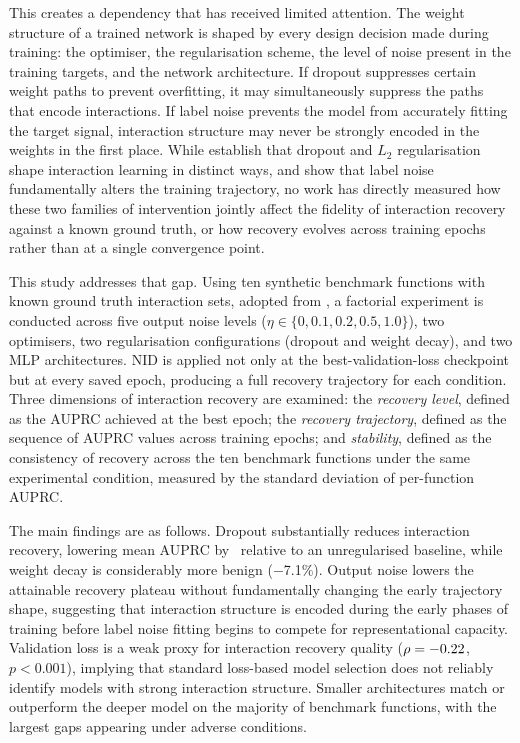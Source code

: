 \documentclass{article}
\begin{document}
This creates a dependency that has received limited attention. The
weight structure of a trained network is shaped by every design decision made
during training: the optimiser, the regularisation scheme, the level of noise
present in the training targets, and the network architecture. If dropout
suppresses certain weight paths to prevent overfitting, it may simultaneously
suppress the paths that encode interactions. If label noise prevents the model
from accurately fitting the target signal, interaction structure may never be
strongly encoded in the weights in the first place. While
\cite{lengerich2021dropoutregularizerinteractioneffects} establish that
dropout and \(L_2\) regularisation shape interaction learning in distinct ways,
and \cite{arpit2017closerlookmemorizationdeep} show that label noise
fundamentally alters the training trajectory, no work has directly measured how
these two families of intervention jointly affect the fidelity of interaction
recovery against a known ground truth, or how recovery evolves across training
epochs rather than at a single convergence point.


This study addresses that gap. Using ten synthetic benchmark functions with
known ground truth interaction sets, adopted from \cite{tsang2017detecting}, a
factorial experiment is conducted across five output noise levels ($\eta \in
\{0, 0.1, 0.2, 0.5, 1.0\}$), two optimisers, two regularisation
configurations (dropout and weight decay), and two MLP architectures. NID is
applied not only at the best-validation-loss checkpoint but at every saved
epoch, producing a full recovery trajectory for each condition. Three
dimensions of interaction recovery are examined: the \textit{recovery level},
defined as the AUPRC achieved at the best epoch; the \textit{recovery
trajectory}, defined as the sequence of AUPRC values across training epochs;
and \textit{stability}, defined as the consistency of recovery across
the ten benchmark functions under the same experimental condition, measured by
the standard deviation of per-function AUPRC.


The main findings are as follows. Dropout substantially reduces interaction
recovery, lowering mean AUPRC by \statDropoutDrop\ relative to an
unregularised baseline, while weight decay is considerably more benign
($-$7.1\%). Output noise lowers the attainable recovery plateau without
fundamentally changing the early trajectory shape, suggesting that interaction
structure is encoded during the early phases of training before label noise
fitting begins to compete for representational capacity. Validation loss is a
weak proxy for interaction recovery quality ($\rho = -0.22$,
$p < 0.001$), implying that standard loss-based model selection does not
reliably identify models with strong interaction structure. Smaller architectures
match or outperform the deeper model on the majority of benchmark functions,
with the largest gaps appearing under adverse conditions.
\end{document}
